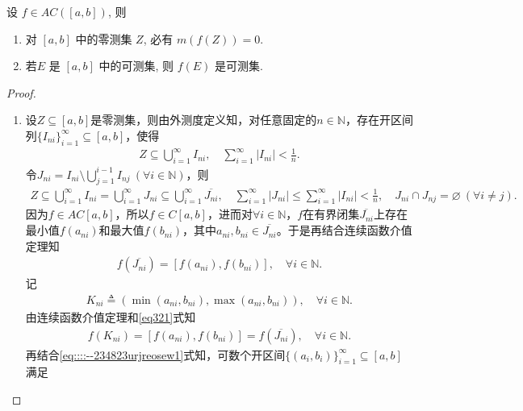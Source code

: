 \documentclass[../../main.tex]{subfiles}%
\begin{document}
\begin{proposition}\label{proposition:绝对连续函数零测集的像仍零测}
设 $f\in  AC([a,b])$, 则
\begin{enumerate}[(1)]
\item 对 $[a,b]$ 中的零测集 $Z$, 必有 $m(f(Z))=0$.

\item 若$E$ 是 $[a,b]$ 中的可测集, 则 $f(E)$ 是可测集.
\end{enumerate}
\end{proposition}
\begin{proof}
\begin{enumerate}[(1)]
\item 设$Z\subseteq [a,b]$是零测集，则由外测度定义知，对任意固定的$n\in \mathbb{N}$，存在开区间列$\{I_{ni}\}_{i=1}^{\infty}\subseteq [a,b]$，使得
\begin{align*}
Z\subseteq \bigcup\limits_{i=1}^{\infty}I_{ni},\quad \sum\limits_{i=1}^{\infty}|I_{ni}|<\frac{1}{n}.
\end{align*}
令$J_{ni}=I_{ni}\setminus \bigcup\limits_{j=1}^{i-1}I_{nj}\ (\forall i\in \mathbb{N})$，则
\begin{align}
Z\subseteq \bigcup\limits_{i=1}^{\infty}I_{ni}=\bigcup\limits_{i=1}^{\infty}J_{ni}\subseteq \bigcup\limits_{i=1}^{\infty}\overline{J_{ni}},\quad \sum\limits_{i=1}^{\infty}|J_{ni}|\leqslant \sum\limits_{i=1}^{\infty}|I_{ni}|<\frac{1}{n},\quad J_{ni}\cap J_{nj}=\varnothing\ (\forall i\neq j). \label{eq::::--234823urjreosew1}
\end{align}
因为$f\in AC[a,b]$，所以$f\in C[a,b]$，进而对$\forall i\in \mathbb{N}$，$f$在有界闭集$\overline{J_{ni}}$上存在最小值$f(a_{ni})$和最大值$f(b_{ni})$，其中$a_{ni},b_{ni}\in \overline{J_{ni}}$。于是再结合连续函数介值定理知
\begin{align}
f\left( \overline{J_{ni}} \right) =\left[ f\left( a_{ni} \right) ,f\left( b_{ni} \right) \right],\quad \forall i\in \mathbb{N}. \label{eq321}
\end{align}
记
\begin{align*}
K_{ni}\triangleq \left( \min \left( a_{ni},b_{ni} \right) ,\max \left( a_{ni},b_{ni} \right) \right),\quad \forall i\in \mathbb{N}.
\end{align*}
由连续函数介值定理和\eqref{eq321}式知
\begin{align*}
f\left( K_{ni} \right) =\left[ f\left( a_{ni} \right) ,f\left( b_{ni} \right) \right] =f\left( \overline{J_{ni}} \right),\quad \forall i\in \mathbb{N}.
\end{align*}
再结合\eqref{eq::::--234823urjreosew1}式知，可数个开区间$\{(a_i,b_i)\}_{i=1}^{\infty}\subseteq [a,b]$满足

\end{enumerate}
\end{proof}
\end{document}
